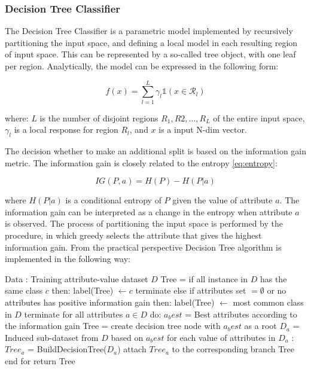 \subsubsection{Decision Tree Classifier}
The Decision Tree Classifier is a parametric model implemented by recursively partitioning the input space, and defining a local model in each resulting region of input space. This can be represented by a so-called tree object, with one leaf per region. 
Analytically, the model can be expressed in the following form: 

\begin{equation}
    f(x) = \sum^{L}_{l=1} \gamma_l \mathds{1}(x \in \mathcal{R}_{l})
\end{equation}

where: $L$ is the number of disjoint regions $R_{1},R{2}, \ldots, R_{L}$ of the entire input space, $\gamma_l$ is a local response for region $R_l$, and $x$ is a input N-dim vector.  

The decision whether to make an additional split is based on the information gain metric. The information gain is closely related to the entropy \ref{eq:entropy}: 

\begin{equation}
    IG(P,a) = H(P) - H(P|a)
\end{equation}

where $ H(P|a)$ is a conditional entropy of $P$ given the value of attribute $a$. The information gain can be interpreted as a change in the entropy when attribute $a$ is observed. The process of partitioning the input space is performed by the procedure, in which greedy selects the attribute that gives the highest information gain. 
From the practical perspective Decision Tree algorithm is implemented in the following way: 



\begin{algorithm}[caption={Building Decision Tree (psudocode)}, label={DTAlgorithm}]
Data : Training attribute-value dataset $D$
Tree = {}
if all instance in $D$ has the same class $c$ then:
   label(Tree) $\leftarrow c$ 
   terminate
else if attributes set $= \emptyset$ or no attributes has positive information gain then:
   label(Tree) $\leftarrow $ most common class in $D$
   terminate
for all attributes $a \in D$ do:
   $a_best$ = Best attributes according to the information gain
   Tree = create decision tree node with $a_best$ as a root
   $D_a$ = Induced sub-dataset from $D$ based on $a_best$
   for each value of attributes in $D_a$ :
      $Tree_{a}$ = BuildDecisionTree($D_a$)
      attach  $Tree_{a}$  to the corresponding branch Tree
end for
return Tree
\end{algorithm}


